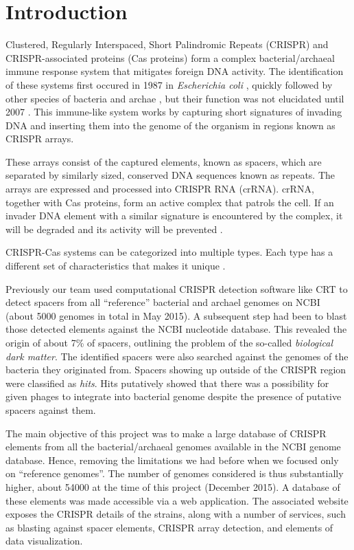\documentclass[11pt, a4paper,titlepage]{article}
\begin{document}

\setcounter{tocdepth}{3}

\tableofcontents
\newpage

\section{Introduction}

Clustered, Regularly Interspaced, Short Palindromic Repeats (CRISPR)
and CRISPR-associated proteins (Cas proteins) form a complex
bacterial/archaeal immune response system that mitigates foreign DNA
activity. The identification of these systems first occured in 1987 in
\emph{Escherichia coli} \cite{nakata1989unusual}, quickly followed by
other species of bacteria and archae \cite{mojica1995long}, but their
function was not elucidated until 2007 \cite{Barrangou23032007}. This
immune-like system works by capturing short signatures of invading DNA
and inserting them into the genome of the organism in regions known as
CRISPR arrays.

These arrays consist of the captured elements, known as spacers, which
are separated by similarly sized, conserved DNA sequences known as
repeats.  The arrays are expressed and processed into CRISPR RNA
(crRNA). crRNA, together with Cas proteins, form an active complex
that patrols the cell. If an invader DNA element with a similar
signature is encountered by the complex, it will be degraded and its
activity will be prevented \cite{Horvath08012010}.

CRISPR-Cas systems can be categorized into multiple types. Each type
has a different set of characteristics that makes it unique
\cite{makarova2011evolution}.

Previously our team used computational CRISPR detection software like
CRT to detect spacers from all ``reference'' bacterial and archael
genomes on NCBI (about 5000 genomes in total in May 2015). A
subsequent step had been to blast those detected elements against the
NCBI nucleotide database. This revealed the origin of about 7\% of
spacers, outlining the problem of the so-called \emph{biological dark
  matter}. The identified spacers were also searched against the
genomes of the bacteria they originated from. Spacers showing up
outside of the CRISPR region were classified as \emph{hits}. Hits
putatively showed that there was a possibility for given phages to
integrate into bacterial genome despite the presence of putative
spacers against them.

The main objective of this project was to make a large database of
CRISPR elements from all the bacterial/archaeal genomes available in
the NCBI genome database. Hence, removing the limitations we had
before when we focused only on ``reference genomes''. The number of
genomes considered is thus substantially higher, about 54000 at the
time of this project (December 2015). A database of these elements was
made accessible via a web application. The associated website exposes
the CRISPR details of the strains, along with a number of services,
such as blasting against spacer elements, CRISPR array detection, and
elements of data visualization.
\end{document}
